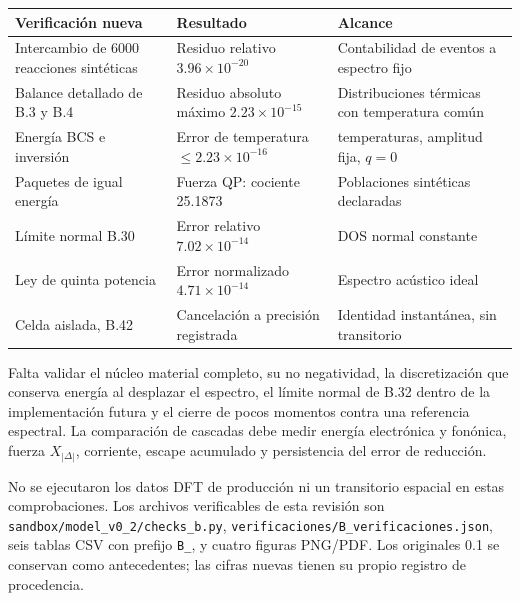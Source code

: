 \documentclass[
  spanish,
  10pt,
  a4paper,
]{article}
\newcounter{none} %
\begin{document}
{\def\LTcaptype{none} %
\begin{longtable}[]{@{}
  >{\raggedright\arraybackslash}p{}
  >{\raggedright\arraybackslash}p{}
  >{\raggedright\arraybackslash}p{}@{}}
\toprule\noalign{}
\begin{minipage}[b]{\linewidth}\raggedright
Verificación nueva
\end{minipage} & \begin{minipage}[b]{\linewidth}\raggedright
Resultado
\end{minipage} & \begin{minipage}[b]{\linewidth}\raggedright
Alcance
\end{minipage} \\
\midrule\noalign{}
\endhead
\bottomrule\noalign{}
\endlastfoot
Intercambio de 6000 reacciones sintéticas & Residuo relativo
\(3.96\times10^{-20}\) & Contabilidad de eventos a espectro fijo \\
Balance detallado de B.3 y B.4 & Residuo absoluto máximo
\(2.23\times10^{-15}\) & Distribuciones térmicas con temperatura
común \\
Energía BCS e inversión & Error de temperatura
\(\leq2.23\times10^{-16}\) & 220 temperaturas, amplitud fija, \(q=0\) \\
Paquetes de igual energía & Fuerza QP: cociente 25.1873 & Poblaciones
sintéticas declaradas \\
Límite normal B.30 & Error relativo \(7.02\times10^{-14}\) & DOS normal
constante \\
Ley de quinta potencia & Error normalizado \(4.71\times10^{-14}\) &
Espectro acústico ideal \\
Celda aislada, B.42 & Cancelación a precisión registrada & Identidad
instantánea, sin transitorio \\
\end{longtable}
}

Falta validar el núcleo material completo, su no negatividad, la
discretización que conserva energía al desplazar el espectro, el límite
normal de B.32 dentro de la implementación futura y el cierre de pocos
momentos contra una referencia espectral. La comparación de cascadas
debe medir energía electrónica y fonónica, fuerza \(X_{|\Delta|}\),
corriente, escape acumulado y persistencia del error de reducción.

No se ejecutaron los datos DFT de producción ni un transitorio espacial
en estas comprobaciones. Los archivos verificables de esta revisión son
\nolinkurl{sandbox/model_v0_2/checks_b.py},
\nolinkurl{verificaciones/B_verificaciones.json}, seis tablas CSV con
prefijo \nolinkurl{B_}, y cuatro figuras PNG/PDF. Los originales 0.1 se
conservan como antecedentes; las cifras nuevas tienen su propio registro
de procedencia.
\end{document}
